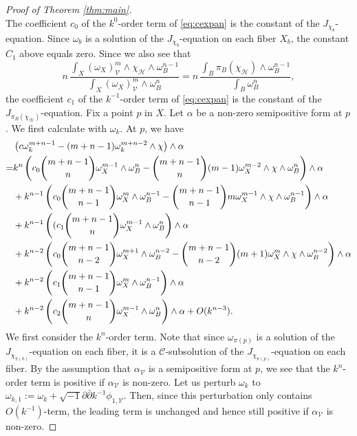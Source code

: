 \documentclass{amsart}
\numberwithin{equation}{section}
\theoremstyle{plain}
\theoremstyle{definition}
\theoremstyle{remark}
\begin{document}
\begin{proof}[Proof of Theorem \ref{thm:main}]
\begin{equation*}
    \end{equation*}
    The coefficient $c_0$ of the $k^0$-order term of \eqref{eq:cexpan} is the constant of the $J_{\chi_b}$-equation. Since $\omega_b$ is a solution of the $J_{\chi_b}$-equation on each fiber $X_b$, the constant $C_1$ above equals zero. Since we also see that
    \begin{equation}\label{eq:c_1}
    n \, \frac{\int_X\left(\omega_X\right)_\mathcal{V}^m \wedge \chi_\mathcal{H} \wedge \omega_B^{n-1} }{\int_X \left(\omega_X\right)_\mathcal{V}^m\wedge\omega_B^n}
    =n \, \frac{\int_B \pi_B\left(\chi_\mathcal{H}\right) \wedge \omega_B^{n-1}}{\int_B \omega_B^n},
    \end{equation}
    the coefficient $c_1$ of the $k^{-1}$-order term of \eqref{eq:cexpan} is the constant of the $J_{\pi_B(\chi_{\mathcal{H}})}$-equation.
    Fix a point $p$ in $X$. Let $\alpha$ be a non-zero semipositive form at $p$. We first calculate with $\omega_k$. At $p$, we have
    \begin{align*}%
        &\left(c\omega_{k}^{m+n-1}-(m+n-1)\omega_{k}^{m+n-2}\wedge\chi\right)\wedge\alpha\\
        =&k^n \left(c_0 {{m+n-1}\choose n} \omega_X^{m-1}\wedge\omega_B^n-{m+n-1\choose n}(m-1)\omega_X^{m-2}\wedge\chi\wedge\omega_B^n \right)\wedge\alpha\notag\\
        &+k^{n-1}\left( c_0{m+n-1\choose n-1}\omega_X^m\wedge\omega_B^{n-1}-{m+n-1\choose n-1}m\omega_X^{m-1}\wedge\chi\wedge\omega_B^{n-1}\right)\wedge\alpha\notag\\
        &+k^{n-1}\left((c_1{m+n-1\choose n}\omega_X^{m-1}\wedge\omega_B^n\right)\wedge\alpha\notag\\
        &+k^{n-2}\left(c_0 {{m+n-1}\choose n-2} \omega_X^{m+1}\wedge\omega_B^{n-2}-{m+n-1\choose n-2}(m+1)\omega_X^{m}\wedge\chi\wedge\omega_B^{n-2}\right)\wedge\alpha\notag\\
        &+k^{n-2}\left(c_1 {{m+n-1}\choose n-1} \omega_X^{m}\wedge\omega_B^{n-1}\right)\wedge\alpha\notag\\
        &+k^{n-2}\left(c_2 {{m+n-1}\choose n} \omega_X^{m-1}\wedge\omega_B^{n}\right)\wedge\alpha+O(k^{n-3})\notag.
    \end{align*}
    We first consider the $k^n$-order term. Note that since $\omega_{\pi(p)}$ is a solution of the $J_{\chi_{\pi(b)}}$-equation on each fiber, it is a $\mathcal{C}$-subsolution of the $J_{\chi_{\pi(p)}}$-equation on each fiber. By the assumption that $\alpha_{\mathcal{V}}$ is a semipositive form at $p$, we see that the $k^n$-order term is positive if $\alpha_{\mathcal{V}}$ is non-zero.
    Let us perturb $\omega_{k}$ to $\omega_{k,1}:=\omega_k+\sqrt{-1}\partial\bar{\partial}k^{-1}\phi_{1,\mathcal{V}}$. Then, since this perturbation only contains $O(k^{-1})$-term, the leading term is unchanged and hence still positive if $\alpha_{\mathcal{V}}$ is non-zero.
    

\end{proof}
\end{document}

